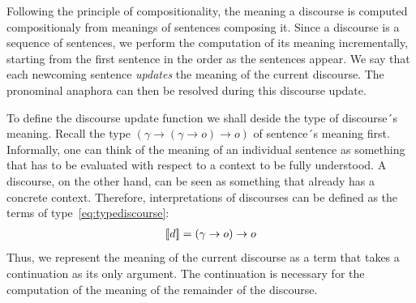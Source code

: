 Following the principle of compositionality, the meaning a discourse is computed compositionaly from meanings of sentences composing it. Since a discourse is a sequence of sentences, we perform the computation of its meaning incrementally, starting from the first sentence in the order as the sentences appear. We say that each newcoming sentence \emph{updates} the meaning of the current discourse. The pronominal anaphora can then be resolved during this discourse update. 

To define the discourse update function we shall deside the type of discourse´s meaning. Recall the type $( \gamma \rightarrow (\gamma \rightarrow o) \rightarrow o )$ of sentence´s meaning first. Informally, one can think of the meaning of an individual sentence as something that has to be evaluated with respect to a context to be fully understood.  A discourse, on the other hand, can be seen as something that already has a concrete context. Therefore, interpretations of discourses can be defined as the terms of type~\eqref{eq:typediscourse}:
\begin{align}
[\![d]\!] =  (\gamma \rightarrow o) \rightarrow o \label{eq:typediscourse}
\end{align}
Thus, we represent the meaning of the current discourse as a term that takes a continuation as its only argument. The continuation is necessary for the computation of the meaning of the remainder of the discourse.  


